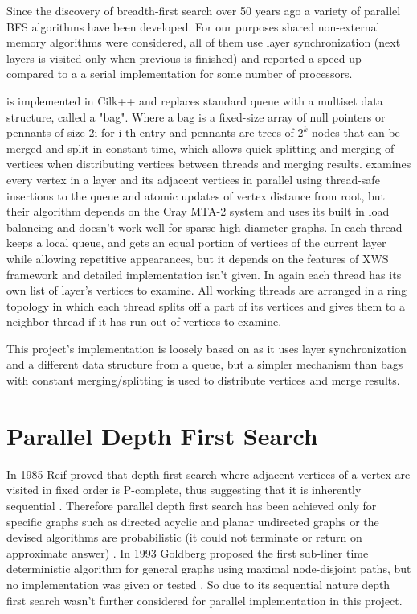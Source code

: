 \documentclass{report}
\theoremstyle{plain}
\theoremstyle{definition}
\theoremstyle{remark}
\begin{document}
Since the discovery of breadth-first search over 50 years ago a variety of parallel BFS algorithms have been developed. For our purposes shared non-external memory algorithms \cite{Leiserson, bader2006designing, cong2008solving, zhang2006parallel} were considered, all of them use layer synchronization (next layers is visited only when previous is finished) and reported a speed up compared to a a serial implementation for some number of processors.

\cite{Leiserson} is implemented in Cilk++ and replaces standard queue with a multiset data structure, called a "bag". Where a bag is a fixed-size array of null pointers or pennants of size 2i for i-th entry and pennants are trees of $2^k$ nodes that can be merged and split in constant time, which allows quick splitting and merging of vertices when distributing vertices between threads and merging results.
\cite{bader2006designing} examines every vertex in a layer and its adjacent vertices in parallel using thread-safe insertions to the queue and atomic updates of vertex distance from root, but their algorithm depends on the Cray MTA-2 system and uses its built in load balancing and doesn't work well for sparse high-diameter graphs.
In \cite{cong2008solving} each thread keeps a local queue, and gets an equal portion of vertices of the current layer while allowing repetitive appearances, but it depends on the features of XWS framework and detailed implementation isn't given.
In \cite{zhang2006parallel} again each thread has its own list of layer's vertices to examine. All working threads are arranged in a ring topology in which each thread splits off a part of its vertices and gives them to a neighbor thread if it has run out of vertices to examine.

This project's implementation is loosely based on \cite{Leiserson} as it uses layer synchronization and a different data structure from a queue, but a simpler mechanism than bags with constant merging/splitting is used to distribute vertices and merge results.

\section{Parallel Depth First Search}

In 1985 Reif proved that depth first search where adjacent vertices of a vertex are visited in fixed order is P-complete, thus suggesting that it is inherently sequential \cite{reif1985depth}. Therefore parallel depth first search has been achieved only for specific graphs such as directed acyclic \cite{ghosh1984parallel} and planar undirected graphs \cite{hagerup1990planar} or the devised algorithms are probabilistic (it could not terminate or return on approximate answer) \cite{aggarwal1989parallel}. In 1993 Goldberg proposed the first sub-liner time deterministic algorithm for general graphs using maximal node-disjoint paths, but no implementation was given or tested \cite{goldberg1993sublinear}. So due to its sequential nature depth first search wasn't further considered for parallel implementation in this project.
\end{document}
